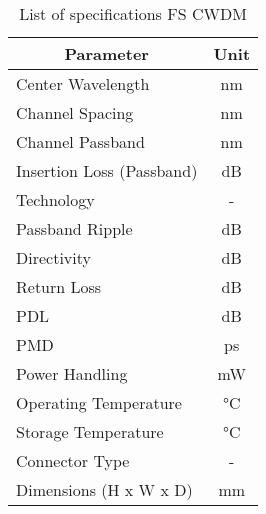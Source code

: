 \begin{table}[!ht]
	\centering
	\cite{noauthor_4ch_nodate}
	\begin{tabular} {|l|c|}
		\hline
		\multicolumn{1}{|c|}{\textbf{Parameter}} & \textbf{Unit} \\ \hline\hline
		Center Wavelength & \unit{\nm} \\ \hline
		Channel Spacing & \unit{\nm} \\ \hline
		Channel Passband & \unit{\nm} \\ \hline
		Insertion Loss (Passband) & \unit{\dB} \\ \hline
		Technology & - \\ \hline
		Passband Ripple & \unit{\dB} \\ \hline
		Directivity & \unit{\dB} \\ \hline
		Return Loss & \unit{\dB} \\ \hline
		PDL & \unit{\dB} \\ \hline
		PMD & \unit{\ps} \\ \hline
		Power Handling & \unit{\mW} \\ \hline
		Operating Temperature & \unit{\degreeCelsius} \\ \hline
		Storage Temperature & \unit{\degreeCelsius} \\ \hline
		Connector Type & - \\ \hline
		Dimensions (H x W x D) & \unit{\mm} \\ \hline
	\end{tabular}
	\caption{List of specifications FS CWDM}
	\label{table:specs2}
\end{table}

